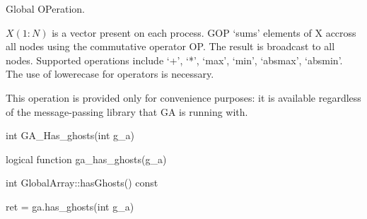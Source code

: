 \documentclass[12pt]{article}
\begin{document}
\wcoll

\begin{desc}

Global OPeration.

$X(1:N)$ is a vector present on each process. GOP `sums' elements of X accross
all nodes using the commutative operator OP. The result is broadcast to all
nodes. Supported operations include `+', `*', `max', `min', `absmax', `absmin'.
The use of lowerecase for operators is necessary.

This operation is provided only for convenience purposes: it is available
regardless of the message-passing library that GA is running with.

\end{desc}


\begin{capi}
\begin{ccode}
int GA_Has_ghosts(int g_a)
\end{ccode}
\begin{funcargs}
\end{funcargs}
\end{capi}

\begin{fapi}
\begin{fcode}
logical function ga_has_ghosts(g_a)
\end{fcode}
\begin{funcargs}
\end{funcargs}
\end{fapi}

\begin{cxxapi}
\begin{cxxcode}
int GlobalArray::hasGhosts() const
\end{cxxcode}
\begin{funcargs}
\end{funcargs}
\end{cxxapi}

\begin{pyapi}
\begin{pycode}
ret = ga.has_ghosts(int g_a)
\end{pycode}
\begin{funcargs}
\end{funcargs}
\end{pyapi}
\end{document}
